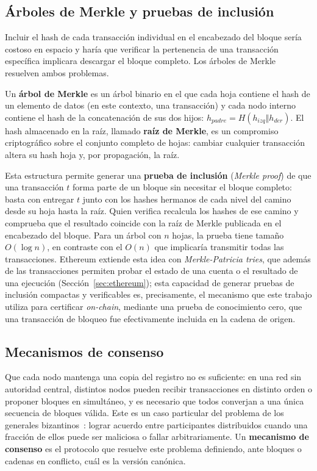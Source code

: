 \subsection{Árboles de Merkle y pruebas de inclusión}
\label{sec:merkle}

Incluir el hash de cada transacción individual en el encabezado del bloque sería costoso en
espacio y haría que verificar la pertenencia de una transacción específica implicara descargar
el bloque completo. Los árboles de Merkle~\cite{merkle1988digital} resuelven ambos problemas.

\begin{definition}
	\label{def:merkle}
	Un \textbf{árbol de Merkle} es un árbol binario en el que cada hoja contiene el hash de un
	elemento de datos (en este contexto, una transacción) y cada nodo interno contiene el hash
	de la concatenación de sus dos hijos: $h_{padre} = H(h_{izq} \Vert h_{der})$. El hash
	almacenado en la raíz, llamado \textbf{raíz de Merkle}, es un compromiso criptográfico sobre
	el conjunto completo de hojas: cambiar cualquier transacción altera su hash hoja y, por
	propagación, la raíz.
\end{definition}

Esta estructura permite generar una \textbf{prueba de inclusión} (\textit{Merkle proof}) de que
una transacción $t$ forma parte de un bloque sin necesitar el bloque completo: basta con
entregar $t$ junto con los hashes hermanos de cada nivel del camino desde su hoja hasta la
raíz. Quien verifica recalcula los hashes de ese camino y comprueba que el resultado coincide
con la raíz de Merkle publicada en el encabezado del bloque. Para un árbol con $n$ hojas, la
prueba tiene tamaño $O(\log n)$, en contraste con el $O(n)$ que implicaría transmitir todas las
transacciones. Ethereum extiende esta idea con \textit{Merkle-Patricia tries}, que además de
las transacciones permiten probar el estado de una cuenta o el resultado de una ejecución
(Sección~\ref{sec:ethereum}); esta capacidad de generar pruebas de inclusión compactas y
verificables es, precisamente, el mecanismo que este trabajo utiliza para certificar
\textit{on-chain}, mediante una prueba de conocimiento cero, que una transacción de bloqueo fue
efectivamente incluida en la cadena de origen.

\subsection{Mecanismos de consenso}

Que cada nodo mantenga una copia del registro no es suficiente: en una red sin autoridad
central, distintos nodos pueden recibir transacciones en distinto orden o proponer bloques en
simultáneo, y es necesario que todos converjan a una única secuencia de bloques válida. Este es
un caso particular del problema de los generales bizantinos~\cite{lamport1982byzantine}: lograr
acuerdo entre participantes distribuidos cuando una fracción de ellos puede ser maliciosa o
fallar arbitrariamente. Un \textbf{mecanismo de consenso} es el protocolo que resuelve este
problema definiendo, ante bloques o cadenas en conflicto, cuál es la versión canónica.

